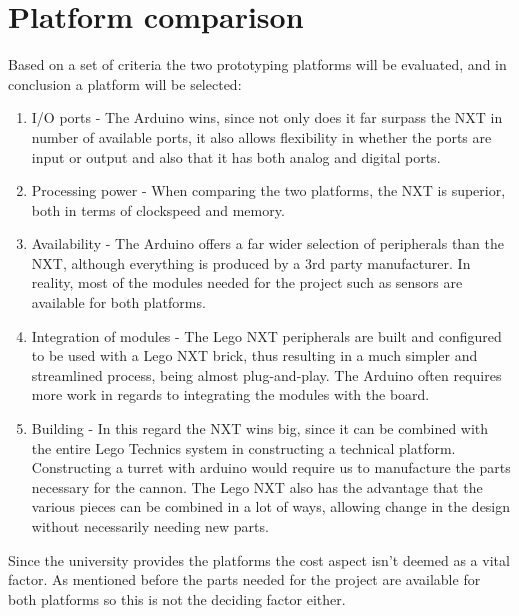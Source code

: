 \section{Platform comparison}
Based on a set of criteria the two prototyping platforms will be evaluated, and
in conclusion a platform will be selected:

\begin{enumerate}
  \item I/O ports - The Arduino wins, since not only does it far surpass
  the NXT in number of available ports, it also allows flexibility in
  whether the ports are input or output and also that it has both analog
  and digital ports.
  \item Processing power - When comparing the two platforms, the NXT is
  superior, both in terms of clockspeed and memory.
  \item Availability - The Arduino offers a far wider selection of peripherals
  than the NXT, although everything is produced by a 3rd party manufacturer. In
  reality, most of the modules needed for the project such as sensors are
  available for both platforms.
  \item Integration of modules - The Lego NXT peripherals are built and
  configured to be used with a Lego NXT brick, thus resulting in a much simpler
  and streamlined process, being almost plug-and-play. The Arduino often
  requires more work in regards to integrating the modules with the board.
  \item Building - In this regard the NXT wins big, since it can be combined
  with the entire Lego Technics system in constructing a technical platform.
  Constructing a turret with arduino would require us to manufacture the parts
  necessary for the cannon. The Lego NXT also has the advantage that the various
  pieces can be combined in a lot of ways, allowing change in the design
  without necessarily needing new parts.
\end{enumerate}

Since the university provides the platforms the cost aspect isn't deemed as a
vital factor. As mentioned before the parts needed for the project are
available for both platforms so this is not the deciding factor either.

